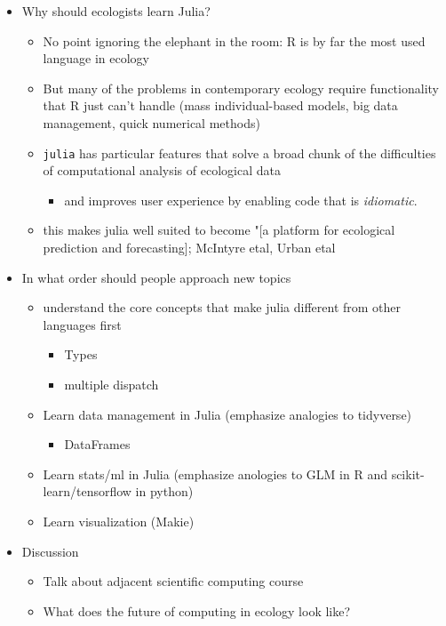 \documentclass[11pt]{article}
\begin{document}
\begin{itemize}
\tightlist
\item
  Why should ecologists learn Julia?

  \begin{itemize}
  \tightlist
  \item
    No point ignoring the elephant in the room: R is by far the most
    used language in ecology
  \item
    But many of the problems in contemporary ecology require
    functionality that R just can't handle (mass individual-based
    models, big data management, quick numerical methods)
  \item
    \texttt{julia} has particular features that solve a broad chunk of
    the difficulties of computational analysis of ecological data

    \begin{itemize}
    \tightlist
    \item
      and improves user experience by enabling code that is
      \emph{idiomatic}.
    \end{itemize}
  \item
    this makes julia well suited to become "{[}a platform for ecological
    prediction and forecasting{]}; McIntyre etal, Urban etal
  \end{itemize}
\item
  In what order should people approach new topics

  \begin{itemize}
  \tightlist
  \item
    understand the core concepts that make julia different from other
    languages first

    \begin{itemize}
    \tightlist
    \item
      Types
    \item
      multiple dispatch
    \end{itemize}
  \item
    Learn data management in Julia (emphasize analogies to tidyverse)

    \begin{itemize}
    \tightlist
    \item
      DataFrames
    \end{itemize}
  \item
    Learn stats/ml in Julia (emphasize anologies to GLM in R and
    scikit-learn/tensorflow in python)
  \item
    Learn visualization (Makie)
  \end{itemize}
\item
  Discussion

  \begin{itemize}
  \tightlist
  \item
    Talk about adjacent scientific computing course
  \item
    What does the future of computing in ecology look like?
  \end{itemize}
\end{itemize}
\end{document}
